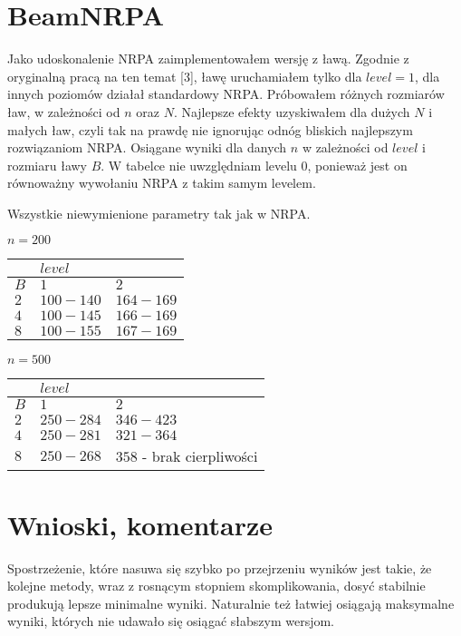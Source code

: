 \documentclass[a4paper,10pt]{article}
\begin{document}
\section{BeamNRPA}
Jako udoskonalenie NRPA zaimplementowałem wersję z ławą. Zgodnie z oryginalną pracą na ten temat [3], ławę uruchamiałem tylko dla $level=1$,
dla innych poziomów działał standardowy NRPA. Próbowałem różnych rozmiarów ław, w zależności od $n$ oraz $N$. Najlepsze efekty uzyskiwałem
dla dużych $N$ i małych ław, czyli tak na prawdę nie ignorując odnóg bliskich najlepszym rozwiązaniom NRPA. Osiągane wyniki dla danych $n$ w
zależności od $level$ i rozmiaru ławy $B$. W tabelce nie uwzględniam levelu 0, ponieważ jest on równoważny wywołaniu NRPA z takim samym levelem.

Wszystkie niewymienione parametry tak jak w NRPA.

$n = 200$

\begin{adjustbox}{center}
\begin{tabularx}{0.7\linewidth}{|X|X|X| }
  \hline
  & \multicolumn{2}{|X|}{$level$} \\
  \hline
  $B$ & $1$ & $2$ \\
  \hline
  $2$ & $100-140$ & $164-169$ \\
  \hline
  $4$ & $100-145$ & $166-169$ \\
  \hline
  $8$ & $100-155$ & $167-169$ \\
  \hline
\end{tabularx}
\end{adjustbox}

\pagebreak
$n = 500$

\begin{adjustbox}{center}
\begin{tabularx}{0.7\linewidth}{|X|X|X| }
  \hline
  & \multicolumn{2}{|X|}{$level$} \\
  \hline
  $B$ & $1$ & $2$ \\
  \hline
  $2$ & $250-284$ & $346 - 423$\\
  \hline
  $4$ & $250-281$ & $321 - 364$  \\
  \hline
  $8$ & $250-268$ & $358$ - brak cierpliwości \\
  \hline
\end{tabularx}
\end{adjustbox}

\section{Wnioski, komentarze}
Spostrzeżenie, które nasuwa się szybko po przejrzeniu wyników jest takie, że kolejne metody, wraz z rosnącym stopniem skomplikowania, dosyć
stabilnie produkują lepsze minimalne wyniki. Naturalnie też łatwiej osiągają maksymalne wyniki, których nie udawało się osiągać słabszym wersjom.
\end{document}
